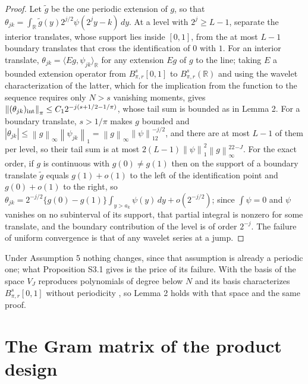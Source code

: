 \documentclass[10pt]{book}
\theoremstyle{definition}
\newcommand{\R}{\mathbb{R}}
\newcommand{\norm}[1]{\left\lVert #1 \right\rVert}
\newcommand{\inner}[2]{\langle #1, #2 \rangle}
\newcommand{\lev}{j}
\newcommand{\tsl}{k}
\newcommand{\VJ}{V_{J}}
\newcommand{\Besov}[3]{B^{#1}_{#2,#3}}
\begin{document}
\begin{proof}
Let $\tilde g$ be the one periodic extension of $g$, so that
$\theta_{\lev\tsl} = \int_{\R}\tilde g(y)2^{\lev/2}\psi(2^{\lev}y-\tsl)\,dy$.
At a level with $2^{\lev} \ge L-1$, separate the interior translates, whose
support lies inside $[0,1]$, from the at most $L-1$ boundary translates that
cross the identification of $0$ with $1$. For an interior translate,
$\theta_{\lev\tsl} = \inner{Eg}{\psi_{\lev\tsl}}_{\R}$ for any extension $Eg$
of $g$ to the line; taking $E$ a bounded extension operator from
$\Besov{s}{\pi}{r}[0,1]$ to $\Besov{s}{\pi}{r}(\R)$
\citep[Chapter 3]{Triebel-1983} and using the wavelet characterization of the
latter, which for the implication from the function to the sequence requires
only $N > s$ vanishing moments, gives
$\norm{(\theta_{\lev\tsl})_{\rm int}}_{\pi} \le C_12^{-\lev(s+1/2-1/\pi)}$,
whose tail sum is bounded as in Lemma 2. For a boundary translate,
$s > 1/\pi$ makes $g$ bounded and
$|\theta_{\lev\tsl}| \le \norm{g}_{\infty}\norm{\psi_{\lev\tsl}}_1 =
\norm{g}_{\infty}\norm{\psi}_12^{-\lev/2}$, and there are at most $L-1$ of
them per level, so their tail sum is at most
$2(L-1)\norm{\psi}_1^2\norm{g}_{\infty}^22^{-J}$. For the exact order, if $g$
is continuous with $g(0) \ne g(1)$ then on the support of a boundary translate
$\tilde g$ equals $g(1)+o(1)$ to the left of the identification point and
$g(0)+o(1)$ to the right, so
$\theta_{\lev\tsl} = 2^{-\lev/2}\{g(0)-g(1)\}\int_{y>a_{\tsl}}\psi(y)\,dy +
o(2^{-\lev/2})$; since $\int\psi = 0$ and $\psi$ vanishes on no subinterval of
its support, that partial integral is nonzero for some translate, and the
boundary contribution of the level is of order $2^{-\lev}$. The failure of
uniform convergence is that of any wavelet series at a jump.
\end{proof}

Under Assumption 5 nothing changes, since that assumption is already a
periodic one; what Proposition S3.1 gives is the price of its failure. With
the basis of \citet*{cohen1993wavelets} the space $\VJ$ reproduces polynomials
of degree below $N$ and its basis characterizes $\Besov{s}{\pi}{r}[0,1]$
without periodicity \citep[Section 3.9]{Cohen-2003}, so Lemma 2 holds with
that space and the same proof.

\section{The Gram matrix of the product design}
\setcounter{equation}{0}
\end{document}
